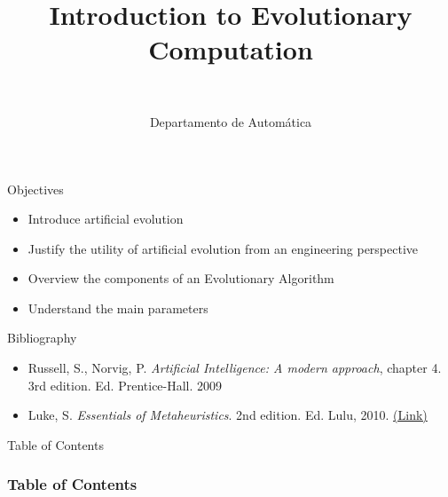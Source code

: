 \documentclass[10pt,compress]{beamer} %
\title[Introduction to Evolutionary Computation]{Introduction to Evolutionary Computation}
\author{\asignatura\\\carrera}
\institute{}
\date{Departamento de Automática}
\begin{document}
{\titlepageBlue
    \begin{frame}
        \titlepage
    \end{frame}
}

\institute{\asignatura}

\begin{frame}[plain]{}
   \begin{block}{Objectives}
       \begin{itemize}
        \item Introduce artificial evolution
	\item Justify the utility of artificial evolution from an engineering perspective
	\item Overview the components of an Evolutionary Algorithm
	\item Understand the main parameters
       \end{itemize}
   \end{block}

   \begin{block}{Bibliography}
   		\begin{itemize}
	    \item Russell, S., Norvig, P. \textit{Artificial Intelligence: A modern approach}, chapter 4. 3rd edition. Ed. Prentice-Hall. 2009
     	\item Luke, S. \emph{Essentials of Metaheuristics}. 2nd edition. Ed. Lulu, 2010. \href{https://cs.gmu.edu/~sean/book/metaheuristics/Essentials.pdf}{(Link)}
   		\end{itemize}
   \end{block}
\end{frame}

{
\begin{frame}[shrink]{Table of Contents}
 \frametitle{Table of Contents}

    \begin{multicols}{2}
    \tableofcontents
    \end{multicols}
\end{frame}
}


\end{document}
